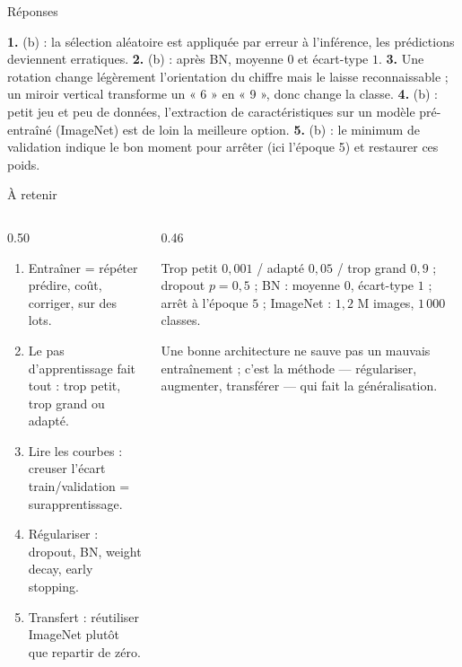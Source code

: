\begin{frame}{Réponses}
\begin{solbox}
\textbf{1.} (b) : la sélection aléatoire est appliquée par erreur à l'inférence,
les prédictions deviennent erratiques. \quad
\textbf{2.} (b) : après BN, moyenne $0$ et écart-type $1$. \quad
\textbf{3.} Une rotation change légèrement l'orientation du chiffre mais le
laisse reconnaissable ; un miroir vertical transforme un « 6 » en « 9 », donc
change la classe. \quad
\textbf{4.} (b) : petit jeu et peu de données, l'extraction de caractéristiques
sur un modèle pré-entraîné (ImageNet) est de loin la meilleure option. \quad
\textbf{5.} (b) : le minimum de validation indique le bon moment pour arrêter
(ici l'époque 5) et restaurer ces poids.
\end{solbox}
\end{frame}

\begin{frame}{À retenir}
\begin{columns}[t]
\begin{column}{0.50\textwidth}
\begin{kbox}
\begin{enumerate}
  \item Entraîner = répéter prédire, coût, corriger, sur des lots.
  \item Le pas d'apprentissage fait tout : trop petit, trop grand ou adapté.
  \item Lire les courbes : creuser l'écart train/validation = surapprentissage.
  \item Régulariser : dropout, BN, weight decay, early stopping.
  \item Transfert : réutiliser ImageNet plutôt que repartir de zéro.
\end{enumerate}
\end{kbox}
\end{column}
\begin{column}{0.46\textwidth}
\begin{ebox}
Trop petit $0{,}001$ / adapté $0{,}05$ / trop grand $0{,}9$ ; dropout
$p = 0{,}5$ ; BN : moyenne $0$, écart-type $1$ ; arrêt à l'époque $5$ ;
ImageNet : $1{,}2$ M images, $1\,000$ classes.
\end{ebox}
\begin{wbox}[La leçon]
Une bonne architecture ne sauve pas un mauvais entraînement ; c'est la
méthode --- régulariser, augmenter, transférer --- qui fait la généralisation.
\end{wbox}
\end{column}
\end{columns}
\end{frame}

